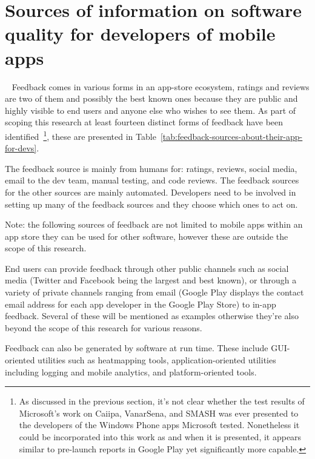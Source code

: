 \section{Sources of information on software quality for developers of mobile apps}~\label{rw-sources-of-info-on-software-quality-for-devs-of-mobile-apps}
Feedback comes in various forms in an app-store ecosystem, ratings and reviews are two of them and possibly the best known ones because they are public and highly visible to end users and anyone else who wishes to see them. As part of scoping this research at least fourteen distinct forms of feedback have been identified~\footnote{As discussed in the previous section, it's not clear whether the test results of Microsoft's work on Caiipa, VanarSena, and SMASH was ever presented to the developers of the Windows Phone apps Microsoft tested. Nonetheless it could be incorporated into this work as and when it is presented, it appears similar to pre-launch reports in Google Play yet significantly more capable.}, these are presented in Table~\ref{tab:feedback-sources-about-their-app-for-devs}.

The feedback source is mainly from humans for: ratings, reviews, social media, email to the dev team, manual testing, and code reviews. The feedback sources for the other sources are mainly automated. Developers need to be involved in setting up many of the feedback sources and they choose which ones to act on.

Note: the following sources of feedback are not limited to mobile apps within an app store they can be used for other software, however these are outside the scope of this research.

End users can provide feedback through other public channels such as social media (Twitter and Facebook being the largest and best known), or through a variety of private channels ranging from email (Google Play displays the contact email address for each app developer in the Google Play Store) to in-app feedback. Several of these will be mentioned as examples otherwise they're also beyond the scope of this research for various reasons. 

Feedback can also be generated by software at run time. These include GUI-oriented utilities such as heatmapping tools, application-oriented utilities including logging and mobile analytics, and platform-oriented tools.



